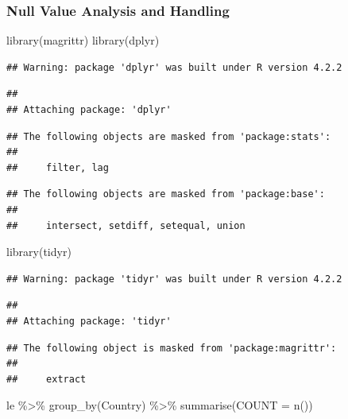 \documentclass[
]{article}
\newenvironment{Shaded}{\begin{snugshade}}{\end{snugshade}}
\newcommand{\AttributeTok}[1]{\textcolor[rgb]{0.77,0.63,0.00}{#1}}
\newcommand{\FunctionTok}[1]{\textcolor[rgb]{0.00,0.00,0.00}{#1}}
\newcommand{\NormalTok}[1]{#1}
\newcommand{\SpecialCharTok}[1]{\textcolor[rgb]{0.00,0.00,0.00}{#1}}
\begin{document}
\hypertarget{null-value-analysis-and-handling}{%
\subsubsection{Null Value Analysis and
Handling}\label{null-value-analysis-and-handling}}

\begin{Shaded}
\begin{Highlighting}[]
\FunctionTok{library}\NormalTok{(magrittr) }
\FunctionTok{library}\NormalTok{(dplyr)  }
\end{Highlighting}
\end{Shaded}

\begin{verbatim}
## Warning: package 'dplyr' was built under R version 4.2.2
\end{verbatim}

\begin{verbatim}
## 
## Attaching package: 'dplyr'
\end{verbatim}

\begin{verbatim}
## The following objects are masked from 'package:stats':
## 
##     filter, lag
\end{verbatim}

\begin{verbatim}
## The following objects are masked from 'package:base':
## 
##     intersect, setdiff, setequal, union
\end{verbatim}

\begin{Shaded}
\begin{Highlighting}[]
\FunctionTok{library}\NormalTok{(tidyr)}
\end{Highlighting}
\end{Shaded}

\begin{verbatim}
## Warning: package 'tidyr' was built under R version 4.2.2
\end{verbatim}

\begin{verbatim}
## 
## Attaching package: 'tidyr'
\end{verbatim}

\begin{verbatim}
## The following object is masked from 'package:magrittr':
## 
##     extract
\end{verbatim}

\begin{Shaded}
\begin{Highlighting}[]
\NormalTok{le }\SpecialCharTok{\%\textgreater{}\%} \FunctionTok{group\_by}\NormalTok{(Country) }\SpecialCharTok{\%\textgreater{}\%} \FunctionTok{summarise}\NormalTok{(}\AttributeTok{COUNT =} \FunctionTok{n}\NormalTok{())}
\end{Highlighting}
\end{Shaded}
\end{document}
